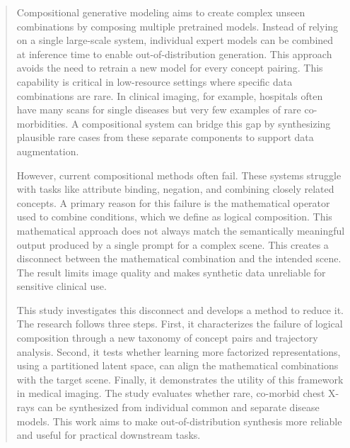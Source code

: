 
\begin{abstract}
Compositional generative modeling aims to create complex unseen combinations by composing multiple pretrained models. 
Instead of relying on a single large-scale system, individual expert models can be combined at inference time to enable out-of-distribution generation. 
This approach avoids the need to retrain a new model for every concept pairing. 
This capability is critical in low-resource settings where specific data combinations are rare. 
In clinical imaging, for example, hospitals often have many scans for single diseases but very few examples of rare co-morbidities. 
A compositional system can bridge this gap by synthesizing plausible rare cases from these separate components to support data augmentation.

However, current compositional methods often fail. 
These systems struggle with tasks like attribute binding, negation, and combining closely related concepts. 
A primary reason for this failure is the mathematical operator used to combine conditions, which we define as logical composition. 
This mathematical approach does not always match the semantically meaningful output produced by a single prompt for a complex scene. 
This creates a disconnect between the mathematical combination and the intended scene. 
The result limits image quality and makes synthetic data unreliable for sensitive clinical use.

This study investigates this disconnect and develops a method to reduce it. 
The research follows three steps. First, it characterizes the failure of logical composition through a new taxonomy of concept pairs and trajectory analysis. 
Second, it tests whether learning more factorized representations, using a partitioned latent space, can align the mathematical combinations with the target scene. 
Finally, it demonstrates the utility of this framework in medical imaging. The study evaluates whether rare, co-morbid chest X-rays can be synthesized from individual common and separate disease models. 
This work aims to make out-of-distribution synthesis more reliable and useful for practical downstream tasks.
\end{abstract}
